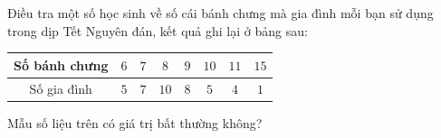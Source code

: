\begin{ex}
Điều tra một số học sinh về số cái bánh chưng mà gia đình mỗi bạn sử dụng trong dịp Tết Nguyên đán, kết quả ghi lại ở bảng sau:
\begin{center}
\begin{tabular}{|c|c|c|c|c|c|c|c|}\hline
Số bánh chưng & $6$ & $7$ & $8$ & $9$ & $10$ & $11$ & $15$\\\hline
Số gia đình & $5$ & $7$ & $10$ & $8$ & $5$ & $4$ & $1$\\\hline
\end{tabular}
\end{center}
Mẫu số liệu trên có giá trị bất thường không?
\end{ex}
